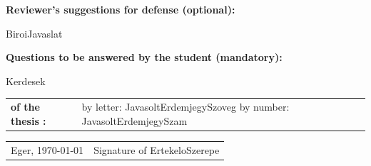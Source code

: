 \documentclass[a4paper,12pt]{article}
\begin{document}
\bigskip


\textbf{Reviewer's suggestions for defense (optional):}

\vspace{0.3cm}

{{BiroiJavaslat}}

\vspace{1cm}

\textbf{Questions to be answered by the student (mandatory):}

\vspace{0.3cm}

{{Kerdesek}}

\vspace{1cm}

\begin{tabularx}{\textwidth}{lX}

\textbf{of the thesis :} &
by letter: {{JavasoltErdemjegySzoveg}}
\hspace{1cm}
by number: {{JavasoltErdemjegySzam}}

\end{tabularx}

\vspace{1.5cm}

\begin{tabularx}{\textwidth}{X X}

Eger, \today &
\hfill Signature of {{ErtekeloSzerepe}}

\end{tabularx}
\end{document}
